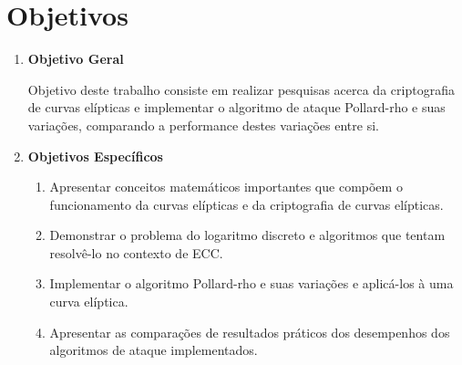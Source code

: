 \section*{Objetivos}
\begin{enumerate}
	\item \textbf{Objetivo Geral}

Objetivo deste trabalho consiste em realizar pesquisas acerca da criptografia de curvas elípticas e implementar o algoritmo de ataque Pollard-rho e suas variações, comparando a performance destes variações entre si.

	\item \textbf{Objetivos Específicos}
	\begin{enumerate}
		\item Apresentar conceitos matemáticos importantes que compõem o funcionamento da curvas elípticas e da criptografia de curvas elípticas.
		\item Demonstrar o problema do logaritmo discreto e algoritmos que tentam resolvê-lo no contexto de ECC.
		\item Implementar o algoritmo Pollard-rho e suas variações e aplicá-los à uma curva elíptica.
		\item Apresentar as comparações de resultados práticos dos desempenhos dos algoritmos de ataque implementados.
	\end{enumerate}
\end{enumerate}
